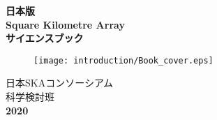 
\thispagestyle{empty}
\begin{center}
{\Huge \bf 日本版}\\
\vspace{5mm}
{\Huge \bf Square Kilometre Array}\\
\vspace{5mm}
{\Huge \bf サイエンスブック}\\
\vspace{1cm}
\begin{figure}[h]
\begin{center}
\texttt{[image: introduction/Book\_cover.eps]}
\end{center}
\end{figure}
\vspace{5mm}
{\Large 日本SKAコンソーシアム}\\
\vspace{5mm}
{\Large 科学検討班}\\
\vspace{1cm}
{\Huge \bf 2020}
\end{center}
\newpage \
